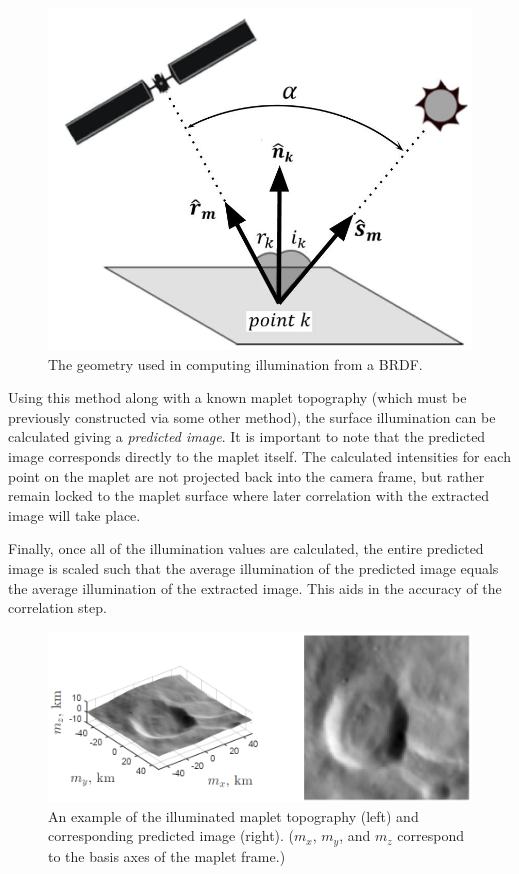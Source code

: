 \documentclass{RPI-SIW}
\begin{document}
\begin{figure}[h]
	\centering
	\includegraphics[width=\columnwidth]{brdf.jpg}
	\caption{The geometry used in computing illumination from a BRDF.}
	\label{figs::brdf}
\end{figure}

Using this method along with a known maplet topography (which must be previously constructed via some other method), the surface illumination can be calculated giving a \textit{predicted image}.  It is important to note that the predicted image corresponds directly to the maplet itself.  The calculated intensities for each point on the maplet are not  projected back into the camera frame, but rather remain locked to the maplet surface where later correlation with the extracted image will take place.

Finally, once all of the illumination values are calculated, the entire predicted image is scaled such that the average illumination of the predicted image equals the average illumination of the extracted image.  This aids in the accuracy of the correlation step.

\begin{figure}[h]
	\centering
	\includegraphics[width=\columnwidth]{predicted_image.png}
	\caption{An example of the illuminated maplet topography (left) and corresponding predicted image (right).  ($m_x$, $m_y$, and $m_z$ correspond to the basis axes of the maplet frame.)}
	\label{figs::predicted}
\end{figure}
\end{document}
